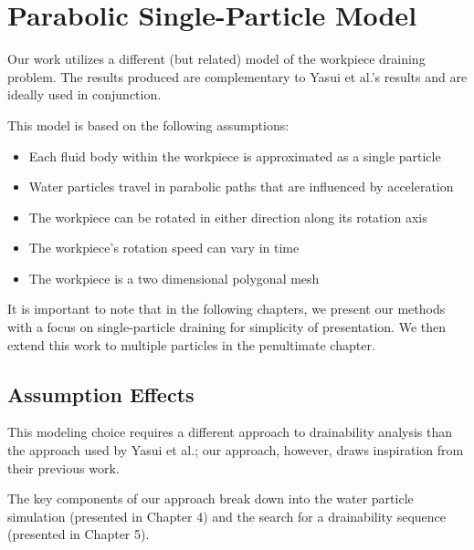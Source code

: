 



\section{Parabolic Single-Particle Model}

Our work utilizes a different (but related) model of the workpiece draining problem. The results produced are complementary to Yasui et al.'s results and are ideally used in conjunction.

This model is based on the following assumptions:

\begin{itemize}
	\item Each fluid body within the workpiece is approximated as a single particle
	\item Water particles travel in parabolic paths that are influenced by acceleration
	\item The workpiece can be rotated in either direction along its rotation axis
	\item The workpiece's rotation speed can vary in time
	\item The workpiece is a two dimensional polygonal mesh
\end{itemize}

It is important to note that in the following chapters, we present our methods with a focus on single-particle draining for simplicity of presentation. We then extend this work to multiple particles in the penultimate chapter.

	\subsection{Assumption Effects}

This modeling choice requires a different approach to drainability analysis than the approach used by Yasui et al.; our approach, however, draws inspiration from their previous work.

The key components of our approach break down into the water particle simulation (presented in Chapter 4) and the search for a drainability sequence (presented in Chapter 5).



